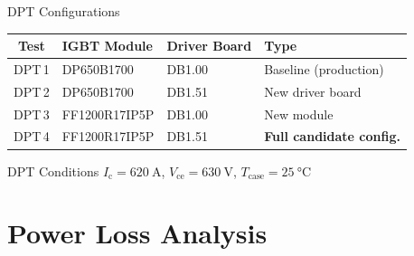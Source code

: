 \documentclass[aspectratio=169, 10pt]{beamer}
\newcommand{\good}[1]{\textcolor{goodgreen}{\textbf{#1}}}
\begin{document}
\begin{frame}{DPT Configurations}
  \centering
  \renewcommand{\arraystretch}{1.6}
  \begin{tabularx}{0.75\textwidth}{c l l l}
    \toprule
    \textbf{Test} & \textbf{IGBT Module} & \textbf{Driver Board} & \textbf{Type} \\
    \midrule
    \rowcolor{rowgray}
    DPT\,1 & DP650B1700    & DB1.00 & Baseline (production) \\
    DPT\,2 & DP650B1700    & DB1.51 & New driver board \\
    \rowcolor{rowgray}
    DPT\,3 & FF1200R17IP5P & DB1.00 & New module \\
    DPT\,4 & FF1200R17IP5P & DB1.51 & \good{Full candidate config.} \\
    \bottomrule
  \end{tabularx}

  \vspace{10pt}
  \begin{block}{DPT Conditions}
    \centering
    $I_\text{c} = \SI{620}{\ampere}$,\quad
    $V_\text{ce} = \SI{630}{\volt}$,\quad
    $T_\text{case} = \SI{25}{\celsius}$
  \end{block}
\end{frame}

\section{Power Loss Analysis}
\end{document}
